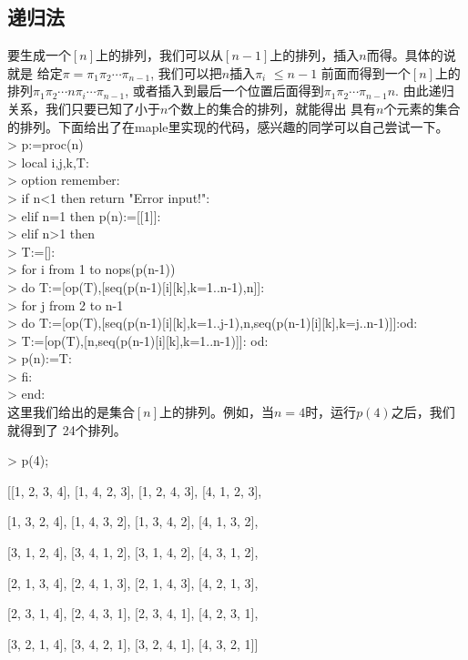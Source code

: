 \documentclass[a4paper,11pt,twoside]{book}
\begin{document}
\subsection{递归法}
要生成一个$[n]$上的排列，我们可以从$[n-1]$上的排列，插入$n$而得。具体的说就是
给定$\pi=\pi_1\pi_2
\cdots \pi_{n-1}$, 我们可以把$n$插入$\pi_i$ $\leq n-1$ 前面而得到一个$[n]$上的排列$\pi_1\pi_2
\cdots n \pi_i \cdots \pi_{n-1}$, 或者插入到最后一个位置后面得到$\pi_1\pi_2
\cdots \pi_{n-1}n$. 由此递归关系，我们只要已知了小于$n$个数上的集合的排列，就能得出
具有$n$个元素的集合的排列。下面给出了在maple里实现的代码，感兴趣的同学可以自己尝试一下。
\\
> p:=proc(n)\\
> local i,j,k,T:\\
> option remember:\\
> if n<1 then return "Error input!":\\
> elif n=1 then p(n):=[[1]]:\\
> elif n>1 then\\
> T:=[]:\\
> for i from 1 to nops(p(n-1))\\
> do T:=[op(T),[seq(p(n-1)[i][k],k=1..n-1),n]]:\\
> for j from 2 to n-1\\
> do T:=[op(T),[seq(p(n-1)[i][k],k=1..j-1),n,seq(p(n-1)[i][k],k=j..n-1)]]:od:\\
> T:=[op(T),[n,seq(p(n-1)[i][k],k=1..n-1)]]: od:\\
> p(n):=T:\\
> fi:\\
> end:\\

这里我们给出的是集合$[n]$上的排列。例如，当$n=4$时，运行$p(4)$之后，我们就得到了
24个排列。

> p(4);

  [[1, 2, 3, 4], [1, 4, 2, 3], [1, 2, 4, 3], [4, 1, 2, 3],

        [1, 3, 2, 4], [1, 4, 3, 2], [1, 3, 4, 2], [4, 1, 3, 2],

        [3, 1, 2, 4], [3, 4, 1, 2], [3, 1, 4, 2], [4, 3, 1, 2],

        [2, 1, 3, 4], [2, 4, 1, 3], [2, 1, 4, 3], [4, 2, 1, 3],

        [2, 3, 1, 4], [2, 4, 3, 1], [2, 3, 4, 1], [4, 2, 3, 1],

        [3, 2, 1, 4], [3, 4, 2, 1], [3, 2, 4, 1], [4, 3, 2, 1]]
\end{document}
